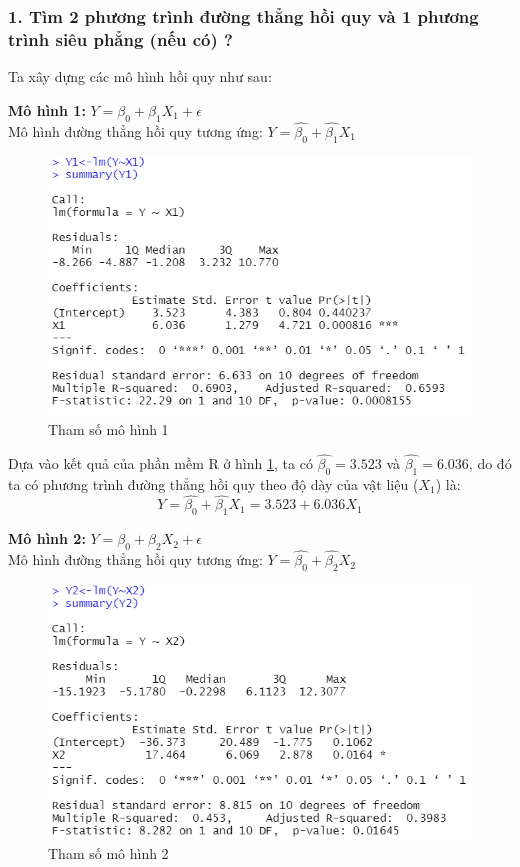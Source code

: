 \documentclass[a4paper]{article}
\theoremstyle{nonumberplain}
\begin{document}
\subsubsection*{1. Tìm 2 phương trình đường thẳng hồi quy và 1 phương trình siêu phẳng (nếu có) ?}

Ta xây dựng các mô hình hồi quy như sau:

\textbf{Mô hình 1:} $Y= \beta_0 + \beta_1 X_1 + \epsilon$\\
Mô hình đường thẳng hồi quy tương ứng: $Y= \hat{\beta_0} + \hat{\beta_1} X_1$

\begin{figure}[h!]
	\centering
	\includegraphics[scale =0.9]{bai2_1i.PNG}
	\caption{Tham số mô hình 1}
	\label{ex2:model:11}
\end{figure}

Dựa vào kết quả của phần mềm R ở hình \ref{ex2:model:11}, ta có $\hat{\beta_0} = 3.523$ và $\hat{\beta_1} = 6.036$, do đó ta có phương trình đường thẳng hồi quy theo độ dày của vật liệu ($X_1$) là:
\[Y = \hat{\beta_0} + \hat{\beta_1} X_1 = 3.523 + 6.036 X_1\]


\textbf{Mô hình 2:} $Y= \beta_0 + \beta_2 X_2 + \epsilon$\\
Mô hình đường thẳng hồi quy tương ứng: $Y= \hat{\beta_0} + \hat{\beta_2} X_2$

\begin{figure}[h!]
	\centering
	\includegraphics[scale =0.9]{bai2_1ii.PNG} 
	\caption{Tham số mô hình 2}
	\label{ex2:model:12}
\end{figure}
\end{document}
